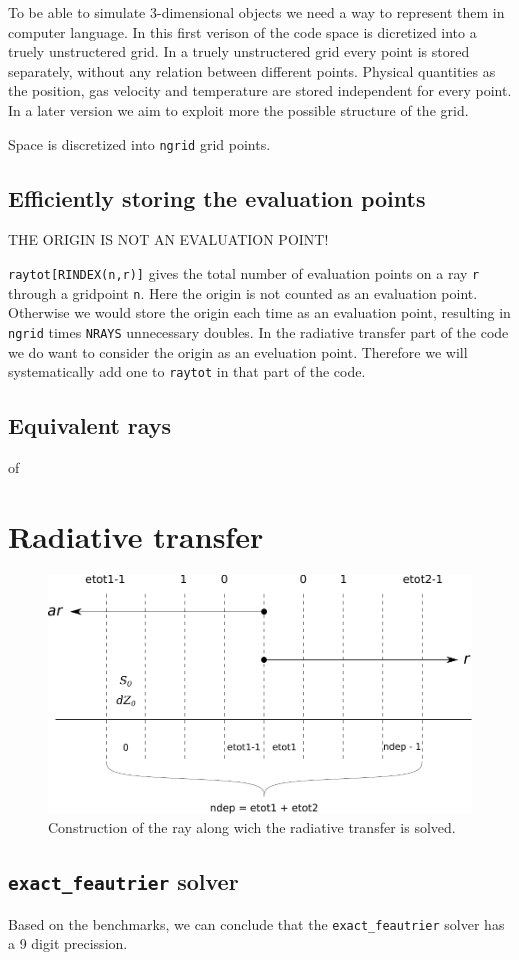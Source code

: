 \documentclass[]{article}
\begin{document}
To be able to simulate 3-dimensional objects we need a way to represent them in computer language. In this first verison of the code space is dicretized into a truely unstructered grid. In a truely unstructered grid every point is stored separately, without any relation between different points. Physical quantities as the position, gas velocity and temperature are stored independent for every point. In a later version we aim to exploit more the possible structure of the grid.

\bigskip

Space is discretized into \texttt{ngrid} grid points.

\subsection{Efficiently storing the evaluation points}

THE ORIGIN IS NOT AN EVALUATION POINT!

\texttt{raytot[RINDEX(n,r)]} gives the total number of evaluation points on a ray \texttt{r} through a gridpoint \texttt{n}. Here the origin is not counted as an evaluation point. Otherwise we would store the origin each time as an evaluation point, resulting in \texttt{ngrid} times \texttt{NRAYS} unnecessary doubles. In the radiative transfer part of the code we do want to consider the origin as an eveluation point. Therefore we will systematically add one to \texttt{raytot} in that part of the code.

\subsection{Equivalent rays}
of

\section{Radiative transfer}

\begin{figure}[H]
	\centering
	\includegraphics[scale=.8]{Images/ray.pdf}
	\caption{Construction of the ray along wich the radiative transfer is solved.}
	\label{grid}
\end{figure}


\subsection{\texttt{exact\_feautrier} solver}

Based on the benchmarks, we can conclude that the \texttt{exact\_feautrier} solver has a 9 digit precission.


\newpage



\end{document}
